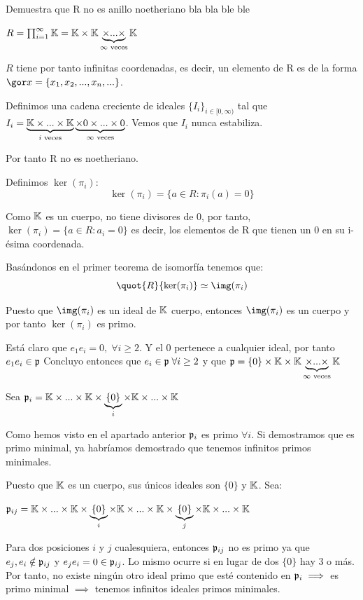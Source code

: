 \begin{problem}
	\ppart Demuestra que R no es anillo noetheriano
	\ppart bla bla
	\ppart ble ble
	\solution

	\spart 
	$R=  \prod_{i=1}^{\infty} \mathbb{K} = \mathbb{K} \times \mathbb{K} \underbrace{\times... \times}_{\infty \text{ veces}} \mathbb{K}$
	
	$R$ tiene por tanto infinitas coordenadas, es decir, un elemento de R es de la forma $\cls{x}=\{x_1,x_2,...,x_n,...\}$.
	
	Definimos una cadena creciente de ideales $\{I_i\}_{i \in [0,\infty)}$ tal que $I_i = \underbrace{\mathbb{K} \times... \times \mathbb{K}}_{i\text{ veces}} \underbrace{\times 0 \times ...  \times 0}_{\infty \text{ veces}}$. Vemos que $I_i$ nunca estabiliza.
	
	Por tanto R no es noetheriano.
	
	
	\spart 
	
	Definimos $\ker(\pi_i)$:
	$$ \ker(\pi_i)=\{ a \in R: \pi_i(a)=0 \} $$
	
	Como $\mathbb{K}$ es un cuerpo, no tiene divisores de 0, por tanto, $\ker(\pi_i) = \{ a \in R: a_i=0 \}$ es decir, los elementos de R que tienen un 0 en su i-ésima coordenada.
	
	Basándonos en el primer teorema de isomorfía tenemos que:
	$$\quot{R}{\ker(\pi_i)} \simeq \img(\pi_i)$$
	
	
	Puesto que  $\img(\pi_i)$ es un ideal de $\mathbb{K}$ cuerpo, entonces $\img(\pi_i)$ es un cuerpo y por tanto $\ker(\pi_i)$ es primo.
	
	\spart
	Está claro que $e_1e_i = 0, \; \forall i \geq 2$. Y el 0 pertenece a cualquier ideal, por tanto $e_1e_i \in \mathfrak{p}$ Concluyo entonces que $e_i \in \mathfrak{p} \; \forall i \geq 2$ y que $\mathfrak{p} = \{0\} \times \mathbb{K} \times \mathbb{K} \underbrace{\times... \times}_{\infty \text{ veces}} \mathbb{K}$
	
	\spart 
	
	Sea $\mathfrak{p}_i =  \mathbb{K} \times ... \times \mathbb{K} \times \underbrace{\{0\}}_{i} \times \mathbb{K} \times ... \times \mathbb{K}$
	
	Como hemos visto en el apartado anterior $\mathfrak{p}_i$ es primo $\forall i$. Si demostramos que es primo minimal, ya habríamos demostrado que tenemos infinitos primos minimales. 
	
	Puesto que $\mathbb{K}$ es un cuerpo, sus únicos ideales son $\{0\}$ y $\mathbb{K}$. Sea:
	
	$\mathfrak{p}_{ij} =  \mathbb{K} \times ... \times \mathbb{K} \times \underbrace{\{0\}}_{i} \times \mathbb{K} \times ... \times \mathbb{K} \times \underbrace{\{0\}}_{j} \times \mathbb{K} \times ... \times \mathbb{K}$
	
	Para dos posiciones $i$ y $j$ cualesquiera, entonces $\mathfrak{p}_{ij}$ no es primo ya que $e_j, e_i \notin \mathfrak{p}_{ij}$ y $e_je_i=0 \in \mathfrak{p}_{ij}$. Lo mismo ocurre si en lugar de dos $\{0\}$ hay 3 o más. Por tanto, no existe ningún otro ideal primo que esté contenido en $\mathfrak{p}_i \implies$ es primo minimal $\implies$ tenemos infinitos ideales primos minimales.
\end{problem}